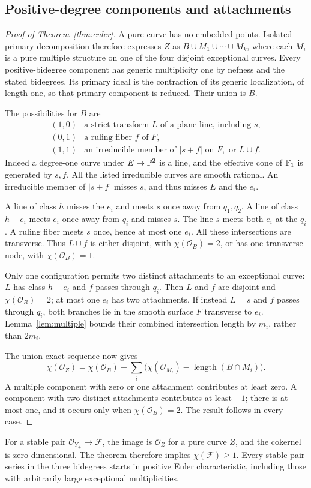 \subsection{Positive-degree components and attachments}
\begin{proof}[Proof of Theorem~\ref{thm:euler}]
A pure curve has no embedded points. Isolated primary decomposition
therefore expresses $Z$ as
$B\cup M_1\cup\cdots\cup M_k$, where each $M_i$ is a pure multiple
structure on one of the four disjoint exceptional curves. Every
positive-bidegree component has generic multiplicity one by nefness
and the stated bidegrees. Its primary ideal is the contraction of its
generic localization, of length one, so that primary component is
reduced. Their union is $B$.

The possibilities for $B$ are
\[
\begin{array}{c|l}
 (1,0)&\text{a strict transform }L\text{ of a plane line, including }s,\\
 (0,1)&\text{a ruling fiber }f\text{ of }F,\\
 (1,1)&\text{an irreducible member of }|s+f|\text{ on }F,
             \text{ or }L\cup f.
\end{array}
\]
Indeed a degree-one curve under $E\to\mathbb P^2$ is a line, and the
effective cone of $\mathbb F_1$ is generated by $s,f$. All the listed
irreducible curves are smooth rational. An irreducible member of
$|s+f|$ misses $s$, and thus misses $E$ and the $e_i$.

A line of class $h$ misses the $e_i$ and meets $s$ once away from
$q_1,q_2$. A line of class $h-e_i$ meets $e_i$ once away from $q_i$
and misses $s$. The line $s$ meets both $e_i$ at the $q_i$.
A ruling fiber meets $s$ once, hence at most one $e_i$.
All these intersections are transverse. Thus $L\cup f$ is either
disjoint, with $\chi(\mathcal O_B)=2$, or has one transverse node,
with $\chi(\mathcal O_B)=1$.

Only one configuration permits two distinct attachments to an
exceptional curve: $L$ has class $h-e_i$ and $f$ passes through
$q_i$. Then $L$ and $f$ are disjoint and $\chi(\mathcal O_B)=2$;
at most one $e_i$ has two attachments. If instead $L=s$ and $f$
passes through $q_i$, both branches lie in the smooth surface $F$
transverse to $e_i$. Lemma~\ref{lem:multiple} bounds their combined
intersection length by $m_i$, rather than $2m_i$.

The union exact sequence now gives
\[
 \chi(\mathcal O_Z)=\chi(\mathcal O_B)+
 \sum_i\bigl(\chi(\mathcal O_{M_i})-
                    \operatorname{length}(B\cap M_i)\bigr).
\]
A multiple component with zero or one attachment contributes at
least zero. A component with two distinct attachments contributes
at least $-1$; there is at most one, and it occurs only when
$\chi(\mathcal O_B)=2$. The result follows in every case.
\end{proof}

For a stable pair $\mathcal O_{Y_+}\to\mathcal F$, the image is
$\mathcal O_Z$ for a pure curve $Z$, and the cokernel is
zero-dimensional. The theorem therefore implies
$\chi(\mathcal F)\ge1$. Every stable-pair series in the three
bidegrees starts in positive Euler characteristic, including those
with arbitrarily large exceptional multiplicities.
